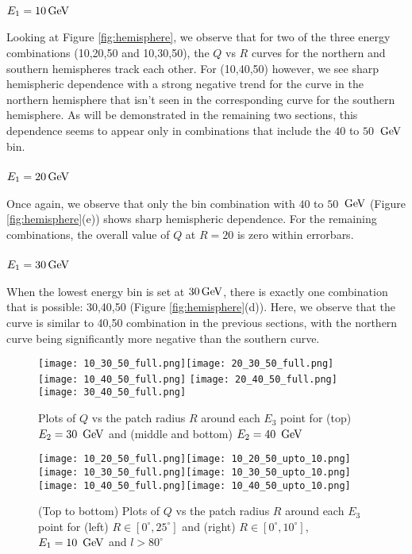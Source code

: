 \subsubsection{$E_1 = 10 \,{\rm GeV}$}
Looking at Figure \ref{fig:hemisphere}, we observe that for two of the three
energy combinations (10,20,50 and 10,30,50), the $Q$ vs $R$ curves for the 
northern and southern hemispheres track each other. 
For (10,40,50) however, we see sharp hemispheric dependence with a strong negative
trend for the curve in the northern hemisphere that isn't seen in the 
corresponding curve for the southern hemisphere.
As will be demonstrated in the remaining two sections, this dependence seems
to appear only in combinations that include the $40$ to $50$ $\,{\rm GeV}$ bin.

\subsubsection{$E_1 = 20 \,{\rm GeV}$}
Once again, we observe that only the bin combination with $40$ to $50$ $\,{\rm GeV}$
(Figure \ref{fig:hemisphere}(e)) shows sharp hemispheric dependence. 
For the remaining combinations, the overall value of $Q$ at $R=20$ is zero within
errorbars.

\subsubsection{$E_1 = 30 \,{\rm GeV}$}
When the lowest energy bin is set at $30 \,{\rm GeV}$, there is exactly one combination
that is possible: 30,40,50 (Figure \ref{fig:hemisphere}(d)).
Here, we observe that the curve is similar to 40,50 combination in the previous 
sections, with the northern curve being significantly more negative than the
southern curve.


\begin{figure}
	\centering
	\texttt{[image: 10\_30\_50\_full.png]}\texttt{[image: 20\_30\_50\_full.png]}
	\texttt{[image: 10\_40\_50\_full.png]}
	\texttt{[image: 20\_40\_50\_full.png]}\texttt{[image: 30\_40\_50\_full.png]}

	\caption{Plots of $Q$ vs the patch radius $R$ around each $E_3$
	point for (top) $E_2 = 30\ \,{\rm GeV}$ and (middle and bottom) 
	$E_2=40\ \GeV$}
	\label{fig:hemisphere_lg80}
\end{figure}



\begin{figure}
	\centering
	\texttt{[image: 10\_20\_50\_full.png]}\texttt{[image: 10\_20\_50\_upto\_10.png]}
	\texttt{[image: 10\_30\_50\_full.png]}\texttt{[image: 10\_30\_50\_upto\_10.png]}
	\texttt{[image: 10\_40\_50\_full.png]}\texttt{[image: 10\_40\_50\_upto\_10.png]}

	\caption{(Top to bottom) Plots of $Q$ vs the patch radius $R$ around each $E_3$
	point for (left) $R\in[0^{\circ},25^{\circ}]$ and (right) 
	$R\in[0^{\circ},10^{\circ}]$, $E_{1} = 10\ \,{\rm GeV}$ and $l>80^{\circ}$}
	\label{fig:hemisphere_lg80}
\end{figure}



